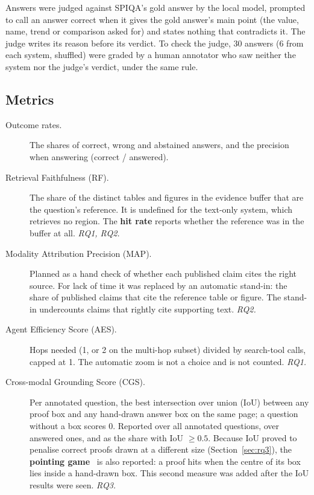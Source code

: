 Answers were judged against SPIQA's gold answer by the local model, prompted to call
an answer correct when it gives the gold answer's main point (the value, name, trend
or comparison asked for) and states nothing that contradicts it. The judge writes its
reason before its verdict. To check the judge, 30 answers (6 from each system,
shuffled) were graded by a human annotator who saw neither the system nor the judge's
verdict, under the same rule.

\subsection{Metrics}

\begin{description}
    \item[Outcome rates.] The shares of correct, wrong and abstained answers, and the
    precision when answering (correct / answered).

    \item[Retrieval Faithfulness (RF).] The share of the distinct tables and figures
    in the evidence buffer that are the question's reference. It is undefined for the
    text-only system, which retrieves no region. The \textbf{hit rate} reports
    whether the reference was in the buffer at all. \emph{RQ1, RQ2.}

    \item[Modality Attribution Precision (MAP).] Planned as a hand check of whether
    each published claim cites the right source. For lack of time it was replaced by
    an automatic stand-in: the share of published claims that cite the reference
    table or figure. The stand-in undercounts claims that rightly cite supporting
    text. \emph{RQ2.}

    \item[Agent Efficiency Score (AES).] Hops needed (1, or 2 on the multi-hop
    subset) divided by search-tool calls, capped at 1. The automatic zoom is not a
    choice and is not counted. \emph{RQ1.}

    \item[Cross-modal Grounding Score (CGS).] Per annotated question, the best
    intersection over union (IoU) between any proof box and any hand-drawn answer box on the
    same page; a question without a box scores 0. Reported over all annotated
    questions, over answered ones, and as the share with IoU $\geq 0.5$. Because IoU
    proved to penalise correct proofs drawn at a different size
    (Section~\ref{sec:rq3}), the \textbf{pointing game}~\cite{zhang2018pointing} is also
    reported: a proof hits when the centre of its box lies inside a hand-drawn box.
    This second measure was added after the IoU results were seen. \emph{RQ3.}
\end{description}

